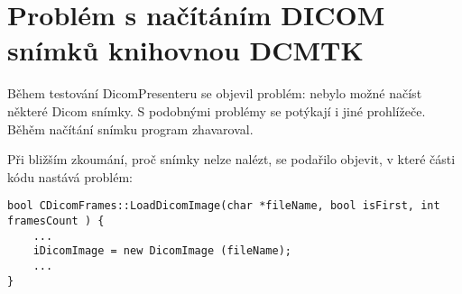 \newpage
\chapter{Problém s načítáním DICOM snímků knihovnou DCMTK}

Během testování DicomPresenteru se objevil problém: nebylo možné načíst některé Dicom snímky. S podobnými problémy se potýkají i jiné prohlížeče. Běhěm načítání snímku program zhavaroval.


\begin{comment}
Situace na poli prohlížečů lékařských snímků je dosti komplikovaná. V práci\cite{flaska} na str. 10 je to blíže vysvětleno: Prohlížeče DICOM snímků jsou buď komerčními placenými produkty a nebo jsou volně šiřitelné, ale nedosahují takových kvalit. Při vývoji DicomPresenteru byl program testován na určité množině snímků (např. archiv ženevské university\citesec{DicomSamples}). Velice známý prohlížeč Medinria, pak nezanedbatelnou část těchto snímků nedokázal správně zobrazit (buď je nenačetl vůbec, nebo je zobrazil s chybami). Tento fakt jen dokazuje to, že volně šiřitelné prohlížeče jsou zatím zpravidla ve fázi vývoje a vývoj DicomPresenteru tak má smysl, neboť pomyslný trh zatím není žádným významným prohlížečem obsazen (jiná situace je u Mac OS X\footnote{Pro operační systém Mac OS X byl vytrořen velice úspešný prohlíčeč OsiriX. Z tohoto důvodu není moc vhodné DicomPresenter v budoucno portovat pro Mac OS X, neboť tam má prohlížeč silnou konkurenci a tak by o něj zřejmě málokdo jevil zájem.}).


S podobnými problémy s jakými se potýkají volně šiřitelné prohlížeče se však potýká i DicomPresenter. Při rozsáhlejším testování programu na větší množině dat nastal problém, že prohlížeč nedokázal načíst poměrně rozsáhlou skupinu DicomSnímků (jiná část snímků ze zmíněného archivu), navíc prohlížeč při pokusu o načtení takového snímku zhavaroval. To se jevilo jako dost závažný problém.
\end{comment}


Při bližším zkoumání, proč snímky nelze nalézt, se podařilo objevit, v které části kódu nastává problém:

\begin{lstlisting}[label=DicomImageClass,caption={Při otevírání snímku aplikace havarovala, k pádu aplikace došlo ve funkci \clist{CDicomFramed::LoadDicomImage} na uvedeném řádku (zde řádek 3).}]
bool CDicomFrames::LoadDicomImage(char *fileName, bool isFirst, int framesCount ) {
 	...
	iDicomImage = new DicomImage (fileName);
	...	
}
\end{lstlisting}

